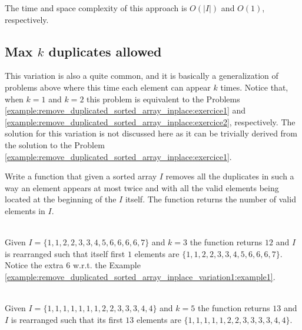 The time and space complexity of this approach is $O(|I|)$ and $O(1)$, respectively.

\subsection{Max $k$ duplicates allowed}
This variation is also a quite common, and it is basically a generalization of problems above where this time each element can appear $k$ times.
Notice that, when $k= 1$ and $k=2$ this problem is equivalent to the Problems \ref{example:remove_duplicated_sorted_array_inplace:exercice1} and \ref{example:remove_duplicated_sorted_array_inplace:exercice2}, respectively.
The solution for this variation is not discussed here as it can be trivially derived from the solution to the Problem \ref{example:remove_duplicated_sorted_array_inplace:exercice1}.

\begin{exercise}
Write a function that given a sorted array $I$ removes all the 
duplicates in such a way an element appears at most twice and with all the valid elements being located at the beginning of the $I$ itself.
The function returns the number of valid elements in $I$.
	
	\label{example:remove_duplicated_sorted_array_inplace_variation:exercice3}
	
		\begin{example}
			\label{example:remove_duplicated_sorted_array_inplace_variation2:example1}
			\hfill \\
			Given $I=\{1,1,2,2,3,3,4,5,6,6,6,6,7\}$ and $k=3$ the function returns $12$ and $I$ is rearranged such
			that itself first $1$ elements are $\{1,1,2,2,3,3,4,5,6,6,6,7\}$. Notice the extra $6$ w.r.t. the Example \ref{example:remove_duplicated_sorted_array_inplace_variation1:example1}.
		\end{example}
	
		\begin{example}
			\label{example:remove_duplicated_sorted_array_inplace_variation2:example2}
			\hfill \\
			Given $I=\{1,1,1,1,1,1,1,2,2,3,3,3,4,4\}$ and $k=5$ the function returns $13$ and $I$ is rearranged such that its first $13$
			elements are $\{1,1,1,1,1,2,2,3,3,3,3,4,4\}$.	
		\end{example}
	\end{exercise}

